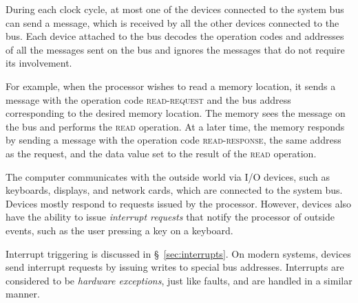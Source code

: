 During each clock cycle, at most one of the devices connected to the system bus
can send a message, which is received by all the other devices connected to the
bus. Each device attached to the bus decodes the operation codes and addresses
of all the messages sent on the bus and ignores the messages that do not
require its involvement.

For example, when the processor wishes to read a memory location, it sends a
message with the operation code \textsc{read-request} and the bus address
corresponding to the desired memory location. The memory sees the message on
the bus and performs the \textsc{read} operation. At a later time, the memory
responds by sending a message with the operation code \textsc{read-response},
the same address as the request, and the data value set to the result of the
\textsc{read} operation.

The computer communicates with the outside world via I/O devices, such as
keyboards, displays, and network cards, which are connected to the system bus.
Devices mostly respond to requests issued by the processor. However, devices
also have the ability to issue \textit{interrupt requests} that notify the
processor of outside events, such as the user pressing a key on a keyboard.

Interrupt triggering is discussed in \S~\ref{sec:interrupts}. On modern
systems, devices send interrupt requests by issuing writes to special bus
addresses. Interrupts are considered to be \textit{hardware exceptions}, just
like faults, and are handled in a similar manner.
